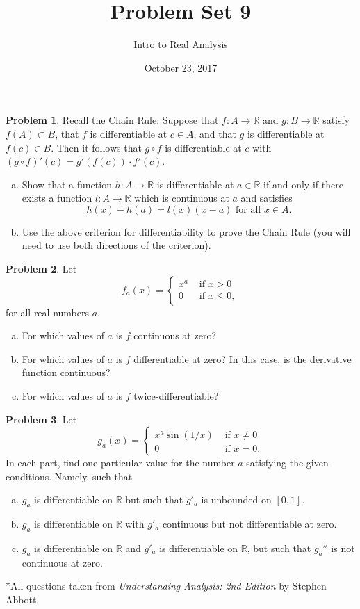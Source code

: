 \documentclass{amsart}
\newcommand{\+}[1]{\ensuremath{\mathbf{#1}}}
\newcommand{\R}{{\mathbb R}}
\theoremstyle{definition}
\newtheorem{prob}{Problem}
\begin{document}
\title{Problem Set 9}
\date{October 23, 2017}
\author{Intro to Real Analysis}

\maketitle

\begin{prob}
Recall the Chain Rule:
Suppose that $f: A \to \R$ and $g: B \to \R$
satisfy $f(A) \subset B$, that
$f$ is differentiable at $c \in A$,
and that $g$ is differentiable
at $f(c) \in B$.
Then it follows that $g \circ f$
is differentiable at $c$ with
$(g \circ f)'(c) = g'(f(c)) \cdot f'(c)$.
\begin{enumerate}[(a)]
 \item Show that a function $h:A \to \R$
 is differentiable at $a \in \R$
 if and only if there exists a function
 $l: A \to \R$ which is continuous at $a$ and satisfies
 \[
 h(x) - h(a) = l(x)(x-a) \text{ for all } x \in A.
 \]
 \item Use the above criterion
 for differentiability
 to prove the Chain Rule (you will need
 to use both directions of the criterion).
\end{enumerate}
\end{prob}


\begin{prob}
Let
\[f_a(x) =
\begin{cases}
x^a &\text{ if } x > 0\\
0 &\text{ if } x \leq 0,
\end{cases}
\]
for all real numbers $a$.
\begin{enumerate}[(a)]
 \item For which values of $a$ is $f$ continuous at zero?
 \item For which values of $a$ is $f$ differentiable at zero?
In this case, is the derivative function continuous?
\item For which values of $a$ is $f$ twice-differentiable?
\end{enumerate}
\end{prob}

\begin{prob}
 Let
 \[
g_a(x) =
\begin{cases}
x^a \sin(1/x) &\text{ if } x \neq 0\\
0 &\text{ if } x = 0.
\end{cases}
\]
In each part, find one particular value for the number $a$ satisfying the given conditions.  Namely, such that
\begin{enumerate}[(a)]
 \item $g_a$ is differentiable on $\R$ but such that $g'_a$ is unbounded on $[0,1]$.
 \item $g_a$ is differentiable on $\R$ with $g'_a$ continuous but not differentiable at zero.
 \item $g_a$ is differentiable on $\R$ and $g'_a$ is differentiable on $\R$,
 but such that $g_a''$ is not continuous at zero.
\end{enumerate}
\end{prob}


\vspace{5mm}

*All questions taken from \emph{Understanding Analysis: 2nd Edition} by Stephen Abbott.
\end{document}
